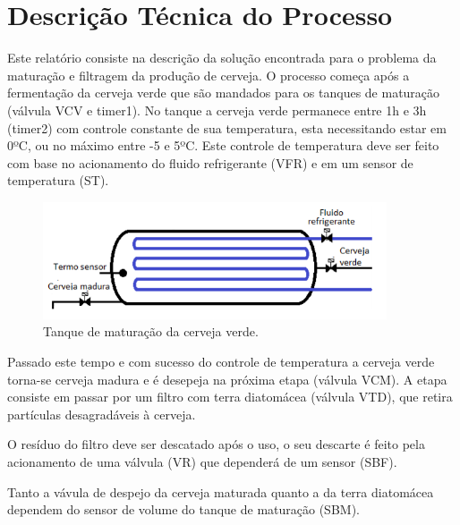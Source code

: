 \documentclass[12pt]{article}
\begin{document}
	
	
	\tableofcontents
	
	\clearpage
	
	\section{Descrição Técnica do Processo}
	
	\begin{par}
		Este relatório consiste na descrição da solução encontrada para o problema da maturação e filtragem da produção de cerveja. O processo começa após a fermentação da cerveja verde que são mandados para os tanques de maturação (válvula VCV e timer1). No tanque a cerveja verde permanece entre 1h e 3h (timer2) com controle constante de sua temperatura, esta necessitando estar em 0ºC, ou no máximo entre -5 e 5ºC. Este controle de temperatura deve ser feito com base no acionamento do fluido refrigerante (VFR) e em um sensor de temperatura (ST).
	\end{par}
	
	\begin{figure}[H]
		\centering
		\includegraphics [width=4in]{tanque.png}
		\caption {Tanque de maturação da cerveja verde.}
		\label{fig:corrente}
	\end{figure}
	
	\begin{par}
		Passado este tempo e com sucesso do controle de temperatura a cerveja verde torna-se cerveja madura e é desepeja na próxima etapa (válvula VCM). A etapa consiste em passar por um filtro com terra diatomácea (válvula VTD), que retira partículas desagradáveis à cerveja. 
		
		O resíduo do filtro deve ser descatado após o uso, o seu descarte é feito pela acionamento de uma válvula (VR) que dependerá de um sensor (SBF).
		
		
		Tanto a vávula de despejo da cerveja maturada quanto a da terra diatomácea dependem do sensor de volume do tanque de maturação (SBM).
	\end{par}
	
\end{document}
